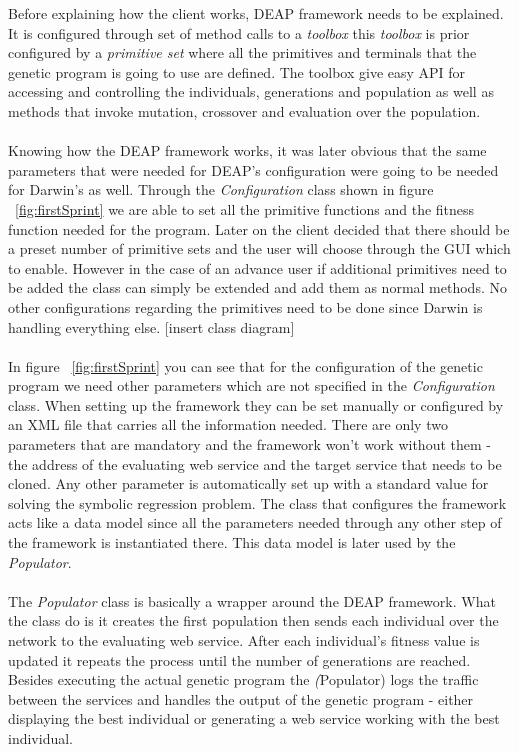 Before explaining how the client works, DEAP framework needs to be explained. It is configured through set of method calls
to a \textit{toolbox} this \textit{toolbox} is prior configured by a \textit{primitive set} where all the primitives and 
terminals that the genetic program is going to use are defined. The toolbox give easy API for accessing and controlling the individuals,
generations and population as well as methods that invoke mutation, crossover and evaluation over the population.
\paragraph{}
Knowing how the DEAP framework works, it was later obvious that the same parameters that were needed for DEAP's configuration
were going to be needed for Darwin's as well. Through the \textit{Configuration} class shown in figure ~\ref{fig:firstSprint}
we are able to set all the primitive functions and the fitness function needed for the program. Later on the client decided
that there should be a preset number of primitive sets and the user will choose through the GUI which to enable. However in
the case of an advance user if additional primitives need to be added the class can simply be extended and add them as
normal methods. No other configurations regarding the primitives need to be done since Darwin is handling everything else.
[insert class diagram]
\paragraph{}
In figure ~\ref{fig:firstSprint} you can see that for the configuration of the genetic program we need other parameters which
are not specified in the \textit{Configuration} class. When setting up the framework they can be set manually or configured
by an XML file that carries all the information needed. There are only two parameters that are mandatory and the framework
won't work without them - the address of the evaluating web service and the target service that needs to be cloned. Any other
parameter is automatically set up with a standard value for solving the symbolic regression problem. The class that configures
the framework acts like a data model since all the parameters needed through any other step of the framework is instantiated there.
This data model is later used by the \textit{Populator}.
\paragraph{}
The \textit{Populator} class is basically a wrapper around the DEAP framework. What the class do is it creates the first population
then sends each individual over the network to the evaluating web service. After each individual's fitness value is updated it
repeats the process until the number of generations are reached. Besides executing the actual genetic program the \textit(Populator)
logs the traffic between the services and handles the output of the genetic program - either displaying the best individual or 
generating a web service working with the best individual.

